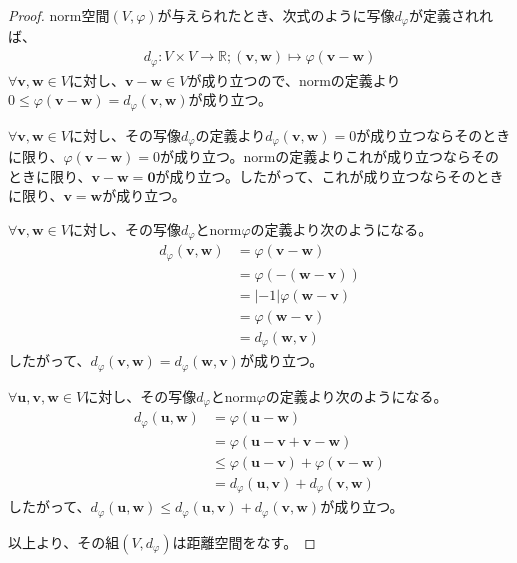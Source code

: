 \documentclass[dvipdfmx]{jsarticle}
\begin{document}
\begin{proof}
norm空間$(V,\varphi)$が与えられたとき、次式のように写像$d_{\varphi}$が定義されれば、
\begin{align*}
d_{\varphi}:V \times V \rightarrow \mathbb{R};\left( \mathbf{v},\mathbf{w} \right) \mapsto \varphi\left( \mathbf{v} - \mathbf{w} \right)
\end{align*}
$\forall\mathbf{v},\mathbf{w} \in V$に対し、$\mathbf{v} - \mathbf{w} \in V$が成り立つので、normの定義より$0 \leq \varphi\left( \mathbf{v} - \mathbf{w} \right) = d_{\varphi}\left( \mathbf{v},\mathbf{w} \right)$が成り立つ。\par
$\forall\mathbf{v},\mathbf{w} \in V$に対し、その写像$d_{\varphi}$の定義より$d_{\varphi}\left( \mathbf{v},\mathbf{w} \right) = 0$が成り立つならそのときに限り、$\varphi\left( \mathbf{v} - \mathbf{w} \right) = 0$が成り立つ。normの定義よりこれが成り立つならそのときに限り、$\mathbf{v} - \mathbf{w} = \mathbf{0}$が成り立つ。したがって、これが成り立つならそのときに限り、$\mathbf{v} = \mathbf{w}$が成り立つ。\par
$\forall\mathbf{v},\mathbf{w} \in V$に対し、その写像$d_{\varphi}$とnorm$\varphi$の定義より次のようになる。
\begin{align*}
d_{\varphi}\left( \mathbf{v},\mathbf{w} \right) &= \varphi\left( \mathbf{v} - \mathbf{w} \right)\\
&= \varphi\left( - \left( \mathbf{w} - \mathbf{v} \right) \right)\\
&= | - 1|\varphi\left( \mathbf{w} - \mathbf{v} \right)\\
&= \varphi\left( \mathbf{w} - \mathbf{v} \right)\\
&= d_{\varphi}\left( \mathbf{w},\mathbf{v} \right)
\end{align*}
したがって、$d_{\varphi}\left( \mathbf{v},\mathbf{w} \right) = d_{\varphi}\left( \mathbf{w},\mathbf{v} \right)$が成り立つ。\par
$\forall\mathbf{u,v},\mathbf{w} \in V$に対し、その写像$d_{\varphi}$とnorm$\varphi$の定義より次のようになる。
\begin{align*}
d_{\varphi}\left( \mathbf{u},\mathbf{w} \right) &= \varphi\left( \mathbf{u - w} \right)\\
&= \varphi\left( \mathbf{u - v + v - w} \right)\\
&\leq \varphi\left( \mathbf{u} - \mathbf{v} \right) + \varphi\left( \mathbf{v} - \mathbf{w} \right)\\
&= d_{\varphi}\left( \mathbf{u,v} \right) + d_{\varphi}\left( \mathbf{v,w} \right)
\end{align*}
したがって、$d_{\varphi}\left( \mathbf{u},\mathbf{w} \right) \leq d_{\varphi}\left( \mathbf{u,v} \right) + d_{\varphi}\left( \mathbf{v,w} \right)$が成り立つ。\par
以上より、その組$\left( V,d_{\varphi} \right)$は距離空間をなす。
\end{proof}
\end{document}
